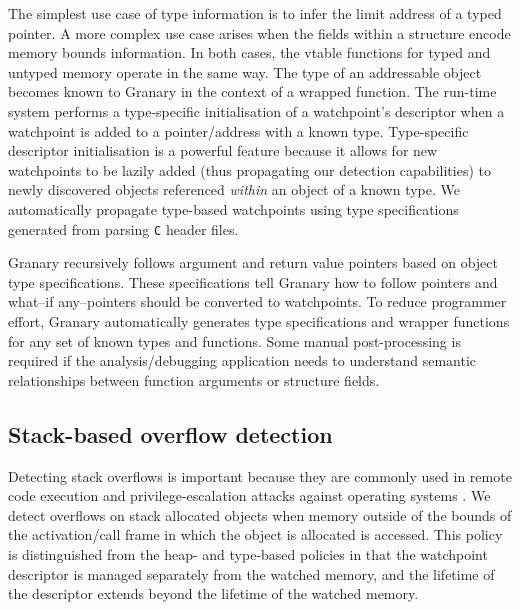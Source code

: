 The simplest use case of type information is to infer the limit address of a typed pointer. A more complex use case arises when the fields within a structure encode memory bounds information. In both cases, the vtable functions for typed and untyped memory operate in the same way.
The type of an addressable object becomes known to Granary in the context of a wrapped function. The run-time system performs a type-specific initialisation of a watchpoint's descriptor when a watchpoint is added to a pointer/address with a known type. Type-specific descriptor initialisation is a powerful feature because it allows for new watchpoints to be lazily added (thus propagating our detection capabilities) to newly discovered objects referenced \emph{within} an object of a known type. We automatically propagate type-based watchpoints using type specifications generated from parsing \texttt{C} header files. %



Granary recursively follows argument and return value pointers based on object type specifications. These specifications tell Granary how to follow pointers and what--if any--pointers should be converted to watchpoints. To reduce programmer effort, Granary automatically generates type specifications and wrapper functions for any set of known types and functions. Some manual post-processing is required if the analysis/debugging application needs to understand semantic relationships between function arguments or structure fields. %



\subsection{Stack-based overflow detection}
Detecting stack overflows is important because they are commonly used in remote code execution and privilege-escalation attacks against operating systems \cite{SecureProgramExecFlowTracking}.
We detect overflows on stack allocated objects when memory outside of the bounds of the activation/call frame in which the object is allocated is accessed. This policy is distinguished from the heap- and type-based policies in that the watchpoint descriptor is managed separately from the watched memory, and the lifetime of the descriptor extends beyond the lifetime of the watched memory.

